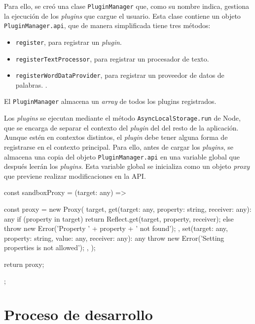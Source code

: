Para ello, se creó una clase \texttt{PluginManager} que, como su nombre indica, gestiona la ejecución de los \textit{plugins} que cargue el usuario. Esta clase contiene un objeto \texttt{PluginManager.api}, que de manera simplificada tiene tres métodos:

\begin{itemize}
	\item \texttt{register}, para registrar un \textit{plugin}.
	\item \texttt{registerTextProcessor}, para registrar un procesador de texto.
	\item \texttt{registerWordDataProvider}, para registrar un proveedor de datos de palabras. .	
\end{itemize}

El \texttt{PluginManager} almacena un \textit{array} de todos los plugins registrados.

Los \textit{plugins} se ejecutan mediante el método \texttt{AsyncLocalStorage.run} de Node, que se encarga de separar el contexto del \textit{plugin} del del resto de la aplicación. Aunque estén en contextos distintos, el \textit{plugin} debe tener alguna forma de registrarse en el contexto principal. Para ello, antes de cargar los \textit{plugins}, se almacena una copia del objeto \texttt{PluginManager.api} en una variable global que después leerán los \textit{plugins}. Esta variable global se inicializa como un objeto \textit{proxy} que previene realizar modificaciones en la API.

\begin{center}
\begin{typescript}
const sandboxProxy = (target: any) => {
	const proxy = new Proxy(
		target,
		{
			get(target: any, property: string, receiver: any): any
			{
				if (property in target)
				{
					return Reflect.get(target, property, receiver);
				}
				else
				{
					throw new Error('Property ' + property + ' not found');
				}
			},
			set(target: any, property: string, value: any, receiver: any): any
			{
				throw new Error('Setting properties is not allowed');
			},
		}
	);
	
	return proxy;
};
\end{typescript}
\end{center}


\section{Proceso de desarrollo}

\todo

